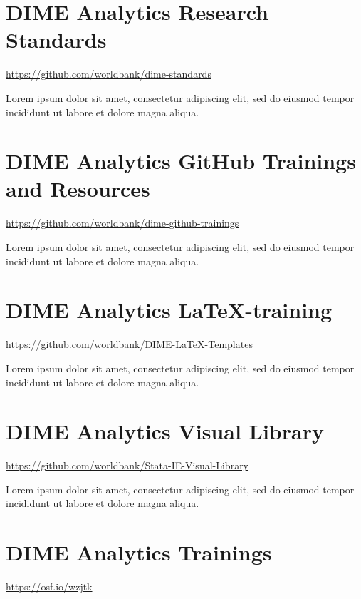 
\filbreak
\section{DIME Analytics Research Standards}
\url{https://github.com/worldbank/dime-standards}
\vspace{\baselineskip}

\noindent Lorem ipsum dolor sit amet, consectetur adipiscing elit, sed do eiusmod tempor incididunt ut labore et dolore magna aliqua.


\filbreak
\section{DIME Analytics GitHub Trainings and Resources}
\url{https://github.com/worldbank/dime-github-trainings}
\vspace{\baselineskip}

\noindent Lorem ipsum dolor sit amet, consectetur adipiscing elit, sed do eiusmod tempor incididunt ut labore et dolore magna aliqua.


\filbreak
\section{DIME Analytics \LaTeX-training}
\url{https://github.com/worldbank/DIME-LaTeX-Templates}
\vspace{\baselineskip}

\noindent Lorem ipsum dolor sit amet, consectetur adipiscing elit, sed do eiusmod tempor incididunt ut labore et dolore magna aliqua.


\filbreak
\section{DIME Analytics Visual Library}
\url{https://github.com/worldbank/Stata-IE-Visual-Library}
\vspace{\baselineskip}

\noindent Lorem ipsum dolor sit amet, consectetur adipiscing elit, sed do eiusmod tempor incididunt ut labore et dolore magna aliqua.


\filbreak
\section{DIME Analytics Trainings}
\url{https://osf.io/wzjtk}
\vspace{\baselineskip}

